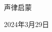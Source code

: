 \documentclass[12pt]{article}
\begin{document}
	
	\begin{titlepage}
		\centering
		\vspace*{3cm}
		{\Huge 声律启蒙}
		
		\vspace{2cm}
		
		\vfill
		{\large 2024年3月29日}
		\date{}
	\end{titlepage}
	
	\maketitle
	
	\thispagestyle{empty}
	\mbox{}
	
	\clearpage
	\setcounter{page}{1}
	\pagestyle{plain}
	
	
	\centering
	
\end{document}
